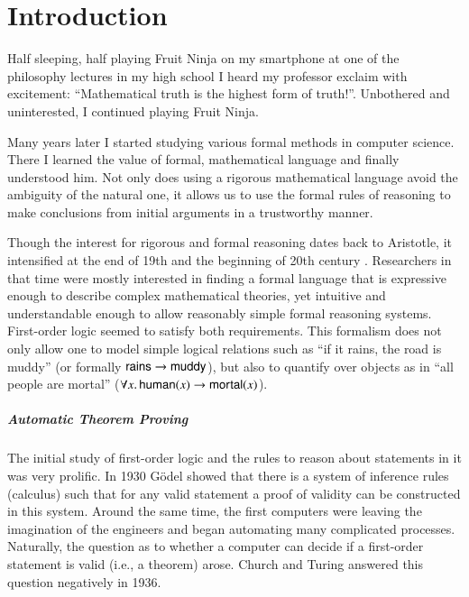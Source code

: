 \chapter{Introduction}
\label{ch:intro}

Half sleeping, half playing Fruit Ninja on my smartphone at one of the
philosophy lectures in my high school I heard my professor exclaim with
excitement: “Mathematical truth is the highest form of truth!”.
Unbothered and uninterested, I continued playing Fruit Ninja.

Many years later I started studying various formal methods in computer science.
There I learned the value of formal, mathematical language and finally
understood him. Not only does using a rigorous mathematical language avoid the
ambiguity of the natural one, it allows us to use the formal rules of reasoning
to make conclusions from initial arguments in a trustworthy manner. 

Though the interest for rigorous and formal reasoning dates back to Aristotle,
it intensified at the end of 19th and the beginning of 20th century
\cite{jf-01-modern-logic}. Researchers in that time were mostly interested in
finding a formal language that is expressive enough to describe complex
mathematical theories, yet intuitive and understandable enough to allow
reasonably simple formal reasoning systems. First-order logic seemed to satisfy
both requirements.  This formalism does not only allow one to model simple
logical relations such as ``if it rains, the road is muddy'' (or formally
$\mathsf{rains} \rightarrow \mathsf{muddy}$), but also to quantify over objects as in ``all
people are mortal'' ($\forall x.\, \mathsf{human}(x) \rightarrow \mathsf{mortal}(x)$).

\paragraph{Automatic Theorem Proving}The initial study of first-order logic and the rules to reason about statements in
it was very prolific. In 1930 G\"odel \cite{kg-30-completeness-theorem} showed
that there is a system of inference rules (calculus) such that for any valid
statement a proof of validity can be constructed in this system. Around the same
time, the first computers were leaving the imagination of the engineers and
began automating many complicated processes.  Naturally, the question as to
whether a computer can decide if a first-order statement is valid (i.e., a
theorem) arose. Church \cite{ac-36-fol-undecidable} and Turing
\cite{tm-37-undecidable} answered this question negatively in 1936.

